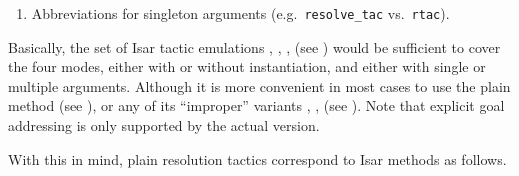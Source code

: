 \begin{isabellebody}
\begin{isamarkuptext}
\begin{enumerate}
  \item Abbreviations for singleton arguments (e.g.\ \verb|resolve_tac|
  vs.\ \verb|rtac|).

  \end{enumerate}

  Basically, the set of Isar tactic emulations \hyperlink{method.rule-tac}{\mbox{}},
  \hyperlink{method.erule-tac}{\mbox{}}, \hyperlink{method.drule-tac}{\mbox{}}, \hyperlink{method.frule-tac}{\mbox{}} (see
  ) would be sufficient to cover the four modes,
  either with or without instantiation, and either with single or
  multiple arguments.  Although it is more convenient in most cases to
  use the plain \hyperlink{method.rule}{\mbox{}} method (see
  ), or any of its ``improper'' variants
  \hyperlink{method.erule}{\mbox{}}, \hyperlink{method.drule}{\mbox{}}, \hyperlink{method.frule}{\mbox{}} (see
  ).  Note that explicit goal addressing is
  only supported by the actual \hyperlink{method.rule-tac}{\mbox{}} version.

  With this in mind, plain resolution tactics correspond to Isar
  methods as follows.


\end{isamarkuptext}
\end{isabellebody}
